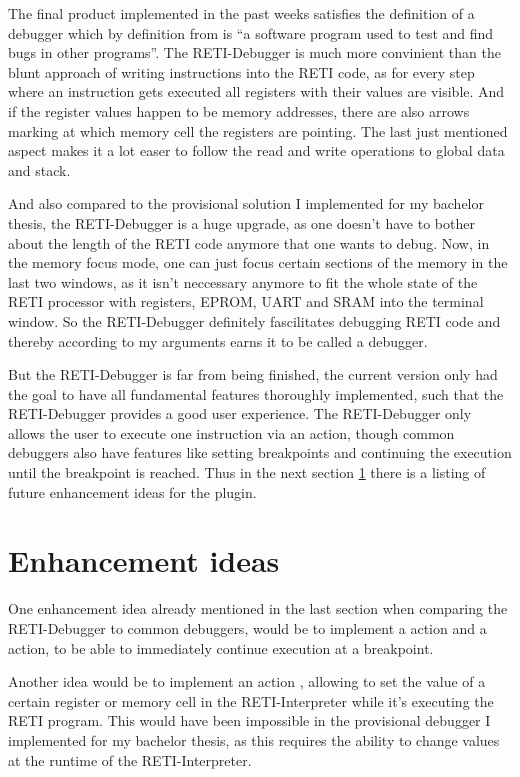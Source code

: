 \documentclass{report}
\begin{document}
The final product implemented in the past weeks satisfies the definition of a \alert{debugger} which by definition from \cite{Debugger2022} is \enquote{a software program used to test and find bugs in other programs}. The RETI-Debugger is much more convinient than the blunt approach of writing  instructions into the RETI code, as for every step where an instruction gets executed all registers with their values are visible. And if the register values happen to be memory addresses, there are also arrows marking at which memory cell the registers are pointing. The last just mentioned aspect makes it a lot easer to follow the read and write operations to global data and stack.

And also compared to the provisional solution I implemented for my bachelor thesis, the RETI-Debugger is a huge upgrade, as one doesn't have to bother about the length of the RETI code anymore that one wants to debug. Now, in the memory focus mode, one can just focus certain sections of the memory in the last two windows, as it isn't neccessary anymore to fit the whole state of the RETI processor with registers, EPROM, UART and SRAM into the terminal window. So the RETI-Debugger definitely fascilitates debugging RETI code and thereby according to my arguments earns it to be called a debugger.

But the RETI-Debugger is far from being finished, the current version only had the goal to have all fundamental features thoroughly implemented, such that the RETI-Debugger provides a good user experience. The RETI-Debugger only allows the user to execute one instruction via an action, though common debuggers also have features like setting breakpoints and continuing the execution until the breakpoint is reached. Thus in the next section \ref{sec:enhancement ideas} there is a listing of future enhancement ideas for the plugin.

\section{Enhancement ideas}
\label{sec:enhancement ideas}

One enhancement idea already mentioned in the last section when comparing the RETI-Debugger to common debuggers, would be to implement a  action and a  action, to be able to immediately continue execution at a breakpoint.

Another idea would be to implement an action , allowing to set the value of a certain register or memory cell in the RETI-Interpreter while it's executing the RETI program. This would have been impossible in the provisional debugger I implemented for my bachelor thesis, as this requires the ability to change values at the runtime of the RETI-Interpreter.
\end{document}
